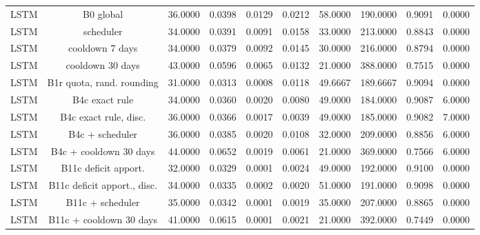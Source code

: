 \documentclass[10pt,onecolumn,letterpaper]{article}
\begin{document}
\begin{table}[!t]
{\begin{tabular}{lccccccccc}
LSTM & B0 global & 36.0000 & 0.0398 & 0.0129 & 0.0212 & 58.0000 & 190.0000 & 0.9091 & 0.0000 \\
LSTM & scheduler & 34.0000 & 0.0391 & 0.0091 & 0.0158 & 33.0000 & 213.0000 & 0.8843 & 0.0000 \\
LSTM & cooldown 7 days & 34.0000 & 0.0379 & 0.0092 & 0.0145 & 30.0000 & 216.0000 & 0.8794 & 0.0000 \\
LSTM & cooldown 30 days & 43.0000 & 0.0596 & 0.0065 & 0.0132 & 21.0000 & 388.0000 & 0.7515 & 0.0000 \\
LSTM & B1r quota, rand. rounding & 31.0000 & 0.0313 & 0.0008 & 0.0118 & 49.6667 & 189.6667 & 0.9094 & 0.0000 \\
LSTM & B4c exact rule & 34.0000 & 0.0360 & 0.0020 & 0.0080 & 49.0000 & 184.0000 & 0.9087 & 6.0000 \\
LSTM & B4c exact rule, disc. & 36.0000 & 0.0366 & 0.0017 & 0.0039 & 49.0000 & 185.0000 & 0.9082 & 7.0000 \\
LSTM & B4c + scheduler & 36.0000 & 0.0385 & 0.0020 & 0.0108 & 32.0000 & 209.0000 & 0.8856 & 6.0000 \\
LSTM & B4c + cooldown 30 days & 44.0000 & 0.0652 & 0.0019 & 0.0061 & 21.0000 & 369.0000 & 0.7566 & 6.0000 \\
LSTM & B11c deficit apport. & 32.0000 & 0.0329 & 0.0001 & 0.0024 & 49.0000 & 192.0000 & 0.9100 & 0.0000 \\
LSTM & B11c deficit apport., disc. & 34.0000 & 0.0335 & 0.0002 & 0.0020 & 51.0000 & 191.0000 & 0.9098 & 0.0000 \\
LSTM & B11c + scheduler & 35.0000 & 0.0342 & 0.0001 & 0.0019 & 35.0000 & 207.0000 & 0.8865 & 0.0000 \\
LSTM & B11c + cooldown 30 days & 41.0000 & 0.0615 & 0.0001 & 0.0021 & 21.0000 & 392.0000 & 0.7449 & 0.0000 \\
\bottomrule
\end{tabular}}
\end{table}
\end{document}

